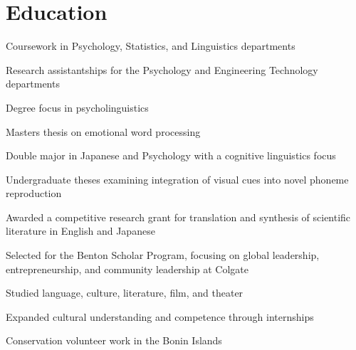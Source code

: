 \documentclass[letterpaper]{deedy-resume} %
\begin{document}
\section{Education}
\begin{tightitemize}
\item Coursework in Psychology, Statistics, and Linguistics departments
\item Research assistantships for the Psychology and Engineering Technology departments
\item Degree focus in psycholinguistics
\item Masters thesis on emotional word processing
\end{tightitemize}
\sectionspace %
\begin{tightitemize}
\item Double major in Japanese and Psychology with a cognitive linguistics focus
\item Undergraduate theses examining integration of visual cues into novel phoneme reproduction
\item Awarded a competitive research grant for translation and synthesis of scientific literature in English and Japanese
\item Selected for the Benton Scholar Program, focusing on global leadership, entrepreneurship, and community leadership at Colgate
\end{tightitemize}
\sectionspace %
\begin{tightitemize}
\item Studied language, culture, literature, film, and theater
\item Expanded cultural understanding and competence through internships
\item Conservation volunteer work in the Bonin Islands
\end{tightitemize}
\end{document}
